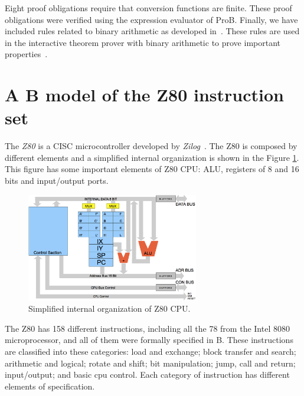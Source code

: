 \documentclass[a4paper]{llncs}
\begin{document}
Eight proof obligations require that conversion functions are finite. %
 These proof obligations were verified using the expression evaluator of ProB.
Finally, we have included rules related to binary arithmetic as developed
in~\cite{Leibnizens}. These rules are used in the interactive theorem prover with
binary arithmetic to prove important properties~\cite{James2010,Dasgupta2006}.



\section{A B model of the Z80 instruction set}
\label{sec:z80}

The \textit{Z80} is a CISC microcontroller developed by
\textit{Zilog}~\cite{Z80_manual}. The Z80 is composed by different
elements and a simplified internal organization is shown in the Figure
\ref{fig:DiagramBlock}.  This figure has some important elements of
Z80 CPU: ALU, registers of 8 and 16 bits and input/output ports.

\begin{figure}[h] \centering
\includegraphics[width=0.67\textwidth]{images/Architecture_compact.png}
\caption{Simplified internal organization of Z80 CPU.}
\label{fig:DiagramBlock}
\end{figure}


The Z80 has 158 different instructions, including all the 78 from the Intel 8080
microprocessor, and all of them were formally specified in B. These instructions are classified
into these categories: load and exchange; block transfer and search; arithmetic
and logical; rotate and shift; bit manipulation; jump, call and return;
input/output; and basic cpu control. Each category of instruction has different
elements of specification.
\end{document}
